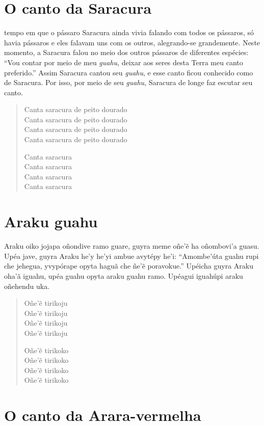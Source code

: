 \chapter{O canto da Saracura}

 tempo em que o pássaro Saracura ainda vivia falando com todos os
pássaros, só havia pássaros e eles falavam uns com os outros,
alegrando-se grandemente. Neste momento, a Saracura falou no meio dos
outros pássaros de diferentes espécies: ``Vou contar por meio de meu
\textit{guahu}, deixar aos seres desta Terra meu canto preferido.'' Assim
Saracura cantou seu \textit{guahu}, e esse canto ficou conhecido como de
Saracura. Por isso, por meio de seu \textit{guahu}, Saracura de longe faz
escutar seu canto.

\begin{verse}
Canta saracura de peito dourado\\
Canta saracura de peito dourado\\
Canta saracura de peito dourado\\
Canta saracura de peito dourado

Canta saracura\\
Canta saracura\\
Canta saracura\\
Canta saracura
\end{verse}

\chapter{Araku guahu}

 Araku oiko jojapa oñondive ramo guare, guyra meme oñe'ẽ ha
oñombovi'a guasu. Upéa jave, guyra Araku he'y he'yi ambue avytépy he'i:
``Amombe'úta guahu rupi che jehegua, yvypórape opyta haguã che ñe'ẽ
poravokue.'' Upéicha guyra Araku oha'ã iguahu, upéa guahu opyta araku
guahu ramo. Upéagui iguahúpi araku oñehendu uka.

\begin{verse}
Oñe'ẽ tirikoju\\
Oñe'ẽ tirikoju\\
Oñe'ẽ tirikoju\\
Oñe'ẽ tirikoju

Oñe'ẽ tirikoko\\
Oñe'ẽ tirikoko\\
Oñe'ẽ tirikoko\\
Oñe'ẽ tirikoko
\end{verse}

\chapter{O canto da Arara-vermelha}

